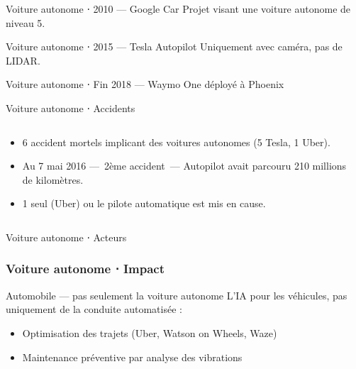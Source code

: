 \begin{frame}{Voiture autonome ⋅ 2010 --- Google Car}
  Projet visant une voiture autonome de niveau 5.

\end{frame}

\begin{frame}{Voiture autonome ⋅ 2015 --- Tesla Autopilot}
  Uniquement avec caméra, pas de LIDAR.

\end{frame}

\begin{frame}{Voiture autonome ⋅ Fin 2018 --- Waymo One déployé à Phoenix}
\end{frame}

\begin{frame}{Voiture autonome ⋅ Accidents}
  \begin{columns}
    \begin{column}{0.6\textwidth}
      \begin{itemize}
        \item 6 accident mortels implicant des voitures autonomes (5 Tesla, 1 Uber).
        \item Au 7 mai 2016 ---~2ème accident~--- Autopilot avait parcouru 210 millions de kilomètres.
        \item 1 seul (Uber) ou le pilote automatique est mis en cause.
      \end{itemize}
    \end{column}
    \begin{column}{0.4\textwidth}
    \end{column}
  \end{columns}
\end{frame}

\begin{frame}{Voiture autonome ⋅ Acteurs}
\end{frame}

\begin{frame}
  \frametitle{Voiture autonome ⋅ Impact}
\end{frame}

\begin{frame}{Automobile --- pas seulement la voiture autonome}
  L'IA pour les véhicules, pas uniquement de la conduite automatisée :
  \begin{itemize}
  \item Optimisation des trajets (Uber, Watson on Wheels, Waze)
  \item Maintenance préventive par analyse des vibrations
  \end{itemize}
\end{frame}

